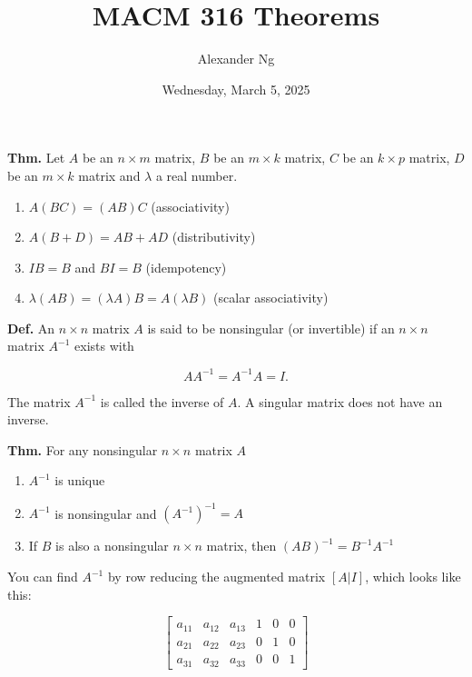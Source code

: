 \documentclass[12pt]{article}
\newcommand{\defn}{\textbf{Def.}\xspace}
\newcommand{\thm}{\textbf{Thm.}\xspace}
\begin{document}
\title{MACM 316 Theorems}
\author{Alexander Ng}
\date{Wednesday, March 5, 2025}

\maketitle

\thm Let $A$ be an $n \times m$ matrix, $B$ be an $m \times k$ matrix, $C$ be an
$k \times p$ matrix, $D$ be an $m \times k$ matrix and $\lambda$ a real number.

\begin{enumerate}[label=(\alph*)]
  \item $A(BC) = (AB)C$ (associativity)
  \item $A(B+D) = AB + AD$ (distributivity)
  \item $IB = B$ and $BI = B$ (idempotency)
  \item $\lambda (AB) = (\lambda A)B = A(\lambda B)$ (scalar associativity)
\end{enumerate}

\defn An $n \times n$ matrix $A$ is said to be nonsingular (or invertible) if an
$n \times n$ matrix $A^{-1}$ exists with 

\[
  A A^{-1} = A^{-1} A = I
.\]

The matrix $A^{-1}$ is called the inverse of $A$. A singular matrix does not
have an inverse.

\thm For any nonsingular $n \times n$ matrix $A$

\begin{enumerate}[label=(\alph*)]
\item $A^{-1}$ is unique
\item $A^{-1}$ is nonsingular and $(A^{-1})^{-1} = A$
\item If $B$ is also a nonsingular $n \times n$ matrix, then $(AB)^{-1} =
  B^{-1}A^{-1}$
\end{enumerate}

You can find $A^{-1}$ by row reducing the augmented matrix $[A | I]$, which
looks like this:

\[
  \left[
    \begin{array}{ccc|ccc}
      a_{11} & a_{12} & a_{13} & 1 & 0 & 0 \\
      a_{21} & a_{22} & a_{23} & 0 & 1 & 0 \\
      a_{31} & a_{32} & a_{33} & 0 & 0 & 1
    \end{array} 
  \right]
\]
\end{document}
